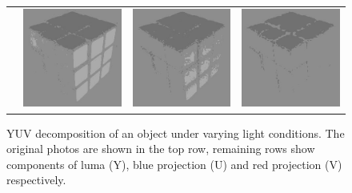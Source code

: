 \begin{figure}
\begin{tabular}{rccc}
         \raisebox{\raiselength}{Red projection} &
         \includegraphics[width=\rubiklength]{img/rubik/1_yuv_v.jpg} & 
         \includegraphics[width=\rubiklength]{img/rubik/2_yuv_v.jpg} & \includegraphics[width=\rubiklength]{img/rubik/3_yuv_v.jpg}
         \end{tabular}
    \caption[YUV decomposition of an object under varying light conditions]{YUV decomposition of an object under varying light conditions. The original photos are shown in the top row, remaining rows show components of luma (Y), blue projection (U) and red projection (V) respectively.}
    \label{fig:rubik_yuv}
\end{figure}


